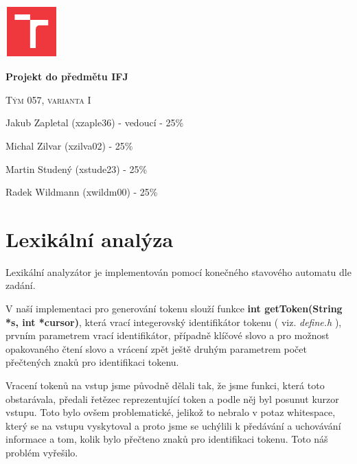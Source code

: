 \documentclass[11pt, a4paper]{article}
\begin{document}
\begin{titlepage}
	\centering
	\includegraphics[width=0.15\textwidth]{VUT_symbol_barevne_CMYK_CZ}\par\vspace{1cm}
	\vspace{1cm}
	{\huge\bfseries Projekt do předmětu IFJ\par}
	\vspace{1.5cm}
	{\scshape\Large Tým 057, varianta I \par}
	\vspace{2cm}
	{\Large Jakub Zapletal (xzaple36) - vedoucí - 25\%\par}
	{\Large Michal Zilvar (xzilva02) - 25\%\par}
	{\Large Martin Studený (xstude23) - 25\%\par}
	{\Large Radek Wildmann (xwildm00) - 25\%\par}
	\vfill
\end{titlepage}

\tableofcontents

\newpage

\section{Lexikální analýza}

Lexikální analyzátor je implementován pomocí konečného stavového automatu dle zadání.

V naší implementaci pro generování tokenu slouží funkce \textbf{int getToken(String *s, int *cursor)}, která vrací integerovský identifikátor tokenu ( viz. \textit{define.h} ), prvním parametrem vrací identifikátor, případně klíčové slovo a pro možnost opakovaného čtení slovo a vrácení zpět ještě druhým parametrem počet přečtených znaků pro identifikaci tokenu.

Vracení tokenů na vstup jsme původně dělali tak, že jsme funkci, která toto obstarávala, předali řetězec reprezentující token a podle něj byl posunut kurzor vstupu. Toto bylo ovšem problematické, jelikož to nebralo v potaz whitespace, který se na vstupu vyskytoval a proto jsme se uchýlili k předávání a uchovávání informace a tom, kolik bylo přečteno znaků pro identifikaci tokenu. Toto náš problém vyřešilo.
\end{document}
